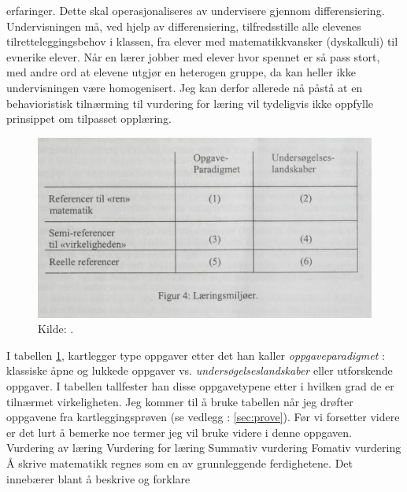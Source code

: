 \documentclass[main.tex]{subfiles}
\begin{document}
erfaringer. Dette skal operasjonaliseres av undervisere gjennom differensiering.  Undervisningen må, ved hjelp av 
differensiering, tilfredsstille alle elevenes tilretteleggingsbehov i klassen, fra elever med matematikkvansker 
(dyskalkuli) til evnerike elever. Når en lærer jobber med elever hvor spennet er så pass stort, med andre ord at elevene 
utgjør en heterogen gruppe, da kan heller ikke undervisningen være homogenisert. Jeg kan derfor allerede nå påstå at en 
behavioristisk tilnærming til vurdering for læring vil tydeligvis ikke oppfylle prinsippet om tilpasset opplæring.
\begin{figure}[h!]
\includegraphics[scale = 0.9]{../figures/laeringsmiljoer.png}
\caption{Kilde: \protect{}.}
\label{fig:skov98}
\end{figure}
I tabellen \ref{fig:skov98}, kartlegger  type oppgaver etter det han kaller \emph{oppgaveparadigmet} :
klassiske åpne og lukkede oppgaver vs. \emph{undersøgelseslandskaber} eller utforskende oppgaver. I tabellen tallfester
han disse oppgavetypene etter i hvilken grad de er tilnærmet virkeligheten. Jeg kommer til å bruke tabellen når jeg
drøfter oppgavene fra kartleggingsprøven (se vedlegg : \ref{sec:prove}).
\newline
\newline
Før vi forsetter videre er det lurt å bemerke noe termer jeg vil bruke videre i denne oppgaven.
\newline
Vurdering av læring
\newline
Vurdering for læring
\newline
Summativ vurdering
\newline
Fomativ vurdering
\newline
\newline
Å skrive matematikk regnes som en av grunnleggende ferdighetene. Det innebærer blant å beskrive og forklare 
\end{document}
